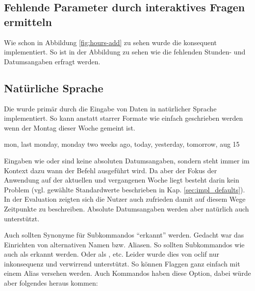 \documentclass[oneside,bibliography=totocnumbered,BCOR=5mm]{scrbook}
\newenvironment{code}{\captionsetup{type=listing, skip=0pt}}{}
\begin{document}
\subsection{Fehlende Parameter durch interaktives Fragen ermitteln}

Wie schon in Abbildung \ref{fig:hours-add} zu sehen wurde die
 konsequent implementiert. So ist in der
Abbildung zu sehen wie die fehlenden Stunden- und Datumsangaben erfragt werden.

\medskip


\subsection{Natürliche Sprache}
\label{sec:sol-natural-lang}

Die  wurde primär durch die Eingabe von Daten in
natürlicher Sprache implementiert. So kann anstatt starrer Formate wie
 einfach  geschrieben werden wenn
der Montag dieser Woche gemeint ist.

\begin{code}
  \medskip
  \begin{shellcode}
  mon, last monday, monday two weeks ago, today, yesterday, tomorrow, aug 15
  \end{shellcode}
\end{code}

Eingaben wie  oder  sind
keine absoluten Datumsangaben, sondern steht immer im Kontext dazu wann der
Befehl ausgeführt wird. Da aber der Fokus der Anwendung auf der aktuellen und
vergangenen Woche liegt besteht darin kein Problem (vgl. gewählte Standardwerte
beschrieben in Kap. \ref{sec:impl_defaults}). In der Evaluation zeigten sich die
Nutzer auch zufrieden damit auf diesem Wege Zeitpunkte zu beschreiben. Absolute
Datumsangaben werden aber natürlich auch unterstützt.

\medskip

Auch sollten Synonyme für Subkommandos ``erkannt'' werden. Gedacht war das
Einrichten von alternativen Namen bzw. Aliasen. So sollten Subkommandos
wie  auch als  erkannt werden. Oder
 als , etc. Leider wurde dies von oclif
nur inkonsequenz und verwirrend unterstützt. So können Flaggen ganz einfach mit
einem Alias versehen werden. Auch Kommandos haben diese Option, dabei würde aber
folgendes heraus kommen:
\end{document}
